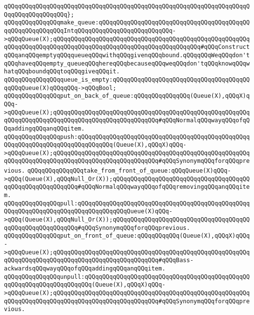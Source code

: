 \verb|qQQqqQQqqQQqqQQqqQQqqQQqqQQqqQQqqQQqqQQqqQQqqQQqqQQqqQQqqQQqqQQqqQQqqQQqqQQqqQQqqQQqqQQq};|\newline
\newline
\verb|qQQqqQQqqQQqqQQqmake_queue:qQQqqQQqqQQqqQQqqQQqqQQqqQQqqQQqqQQqqQQqqQQqqQQqqQQqqQQqqQQqIntqQQqqQQqqQQqqQQqqQQqqQQqqQQq->qQQqQueue(X);qQQqqQQqqQQqqQQqqQQqqQQqqQQqqQQqqQQqqQQqqQQqqQQqqQQqqQQqqQQqqQQqqQQqqQQqqQQqqQQqqQQqqQQqqQQqqQQqqQQqqQQqqQQqqQQq#qQQqConstructqQQqanqQQqemptyqQQqqueueqQQqwithqQQqgivenqQQqbound.qQQqqQQqWeqQQqdon'tqQQqhaveqQQqempty_queueqQQqhereqQQqbecauseqQQqweqQQqdon'tqQQqknowqQQqwhatqQQqboundqQQqtoqQQqgiveqQQqit.|\newline
\verb|qQQqqQQqqQQqqQQqqueue_is_empty:qQQqqQQqqQQqqQQqqQQqqQQqqQQqqQQqqQQqqQQqqQQqQueue(X)qQQqqQQq->qQQqBool;|\newline
\newline
\verb|qQQqqQQqqQQqqQQqput_on_back_of_queue:qQQqqQQqqQQqqQQq(Queue(X),qQQqX)qQQq->qQQqQueue(X);qQQqqQQqqQQqqQQqqQQqqQQqqQQqqQQqqQQqqQQqqQQqqQQqqQQqqQQqqQQqqQQqqQQqqQQqqQQqqQQqqQQqqQQqqQQqqQQqqQQq#qQQqNormalqQQqwayqQQqofqQQqaddingqQQqanqQQqitem.|\newline
\verb|qQQqqQQqqQQqqQQqpush:qQQqqQQqqQQqqQQqqQQqqQQqqQQqqQQqqQQqqQQqqQQqqQQqqQQqqQQqqQQqqQQqqQQqqQQqqQQqqQQq(Queue(X),qQQqX)qQQq->qQQqQueue(X);qQQqqQQqqQQqqQQqqQQqqQQqqQQqqQQqqQQqqQQqqQQqqQQqqQQqqQQqqQQqqQQqqQQqqQQqqQQqqQQqqQQqqQQqqQQqqQQqqQQq#qQQqSynonymqQQqforqQQqprevious.|\newline
\newline
\verb|qQQqqQQqqQQqqQQqtake_from_front_of_queue:qQQqQueue(X)qQQq->qQQq(Queue(X),qQQqNull_Or(X));qQQqqQQqqQQqqQQqqQQqqQQqqQQqqQQqqQQqqQQqqQQqqQQqqQQqqQQqqQQq#qQQqNormalqQQqwayqQQqofqQQqremovingqQQqanqQQqitem.|\newline
\verb|qQQqqQQqqQQqqQQqpull:qQQqqQQqqQQqqQQqqQQqqQQqqQQqqQQqqQQqqQQqqQQqqQQqqQQqqQQqqQQqqQQqqQQqqQQqqQQqqQQqqQQqQueue(X)qQQq->qQQq(Queue(X),qQQqNull_Or(X));qQQqqQQqqQQqqQQqqQQqqQQqqQQqqQQqqQQqqQQqqQQqqQQqqQQqqQQqqQQq#qQQqSynonymqQQqforqQQqprevious.|\newline
\newline
\verb|qQQqqQQqqQQqqQQqput_on_front_of_queue:qQQqqQQqqQQq(Queue(X),qQQqX)qQQq->qQQqQueue(X);qQQqqQQqqQQqqQQqqQQqqQQqqQQqqQQqqQQqqQQqqQQqqQQqqQQqqQQqqQQqqQQqqQQqqQQqqQQqqQQqqQQqqQQqqQQqqQQqqQQq#qQQqBass-ackwardsqQQqwayqQQqofqQQqaddingqQQqanqQQqitem.|\newline
\verb|qQQqqQQqqQQqqQQqunpull:qQQqqQQqqQQqqQQqqQQqqQQqqQQqqQQqqQQqqQQqqQQqqQQqqQQqqQQqqQQqqQQqqQQqqQQq(Queue(X),qQQqX)qQQq->qQQqQueue(X);qQQqqQQqqQQqqQQqqQQqqQQqqQQqqQQqqQQqqQQqqQQqqQQqqQQqqQQqqQQqqQQqqQQqqQQqqQQqqQQqqQQqqQQqqQQqqQQqqQQq#qQQqSynonymqQQqforqQQqprevious.|\newline
